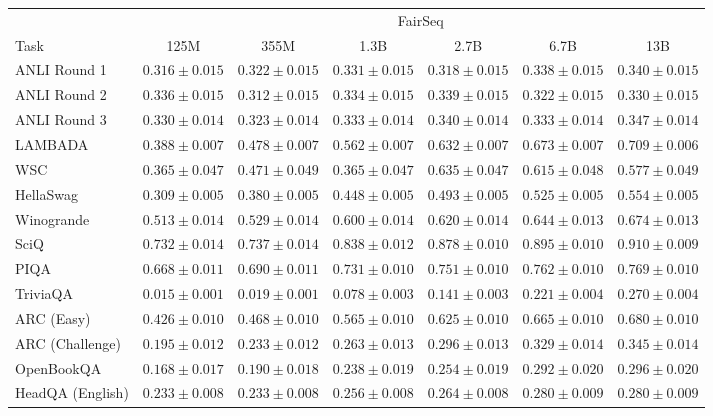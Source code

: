 \documentclass[11pt]{article}
\begin{document}
{\begin{landscape}
\begin{table}    
\centering %
\begin{tabular}{l c c c c c c }
 & \multicolumn{6}{c}{FairSeq} \\
 Task & 125M & 355M & 1.3B & 2.7B & 6.7B & 13B\\ \toprule
ANLI Round 1 & $0.316 \pm 0.015$ & $0.322 \pm 0.015$ & $0.331 \pm 0.015$ & $0.318 \pm 0.015$ & $0.338 \pm 0.015$ & $0.340 \pm 0.015$ \\ 
ANLI Round 2 & $0.336 \pm 0.015$ & $0.312 \pm 0.015$ & $0.334 \pm 0.015$ & $0.339 \pm 0.015$ & $0.322 \pm 0.015$ & $0.330 \pm 0.015$ \\ 
ANLI Round 3 & $0.330 \pm 0.014$ & $0.323 \pm 0.014$ & $0.333 \pm 0.014$ & $0.340 \pm 0.014$ & $0.333 \pm 0.014$ & $0.347 \pm 0.014$ \\ 
LAMBADA & $0.388 \pm 0.007$ & $0.478 \pm 0.007$ & $0.562 \pm 0.007$ & $0.632 \pm 0.007$ & $0.673 \pm 0.007$ & $0.709 \pm 0.006$ \\ 
WSC & $0.365 \pm 0.047$ & $0.471 \pm 0.049$ & $0.365 \pm 0.047$ & $0.635 \pm 0.047$ & $0.615 \pm 0.048$ & $0.577 \pm 0.049$ \\ 
HellaSwag & $0.309 \pm 0.005$ & $0.380 \pm 0.005$ & $0.448 \pm 0.005$ & $0.493 \pm 0.005$ & $0.525 \pm 0.005$ & $0.554 \pm 0.005$ \\ 
Winogrande & $0.513 \pm 0.014$ & $0.529 \pm 0.014$ & $0.600 \pm 0.014$ & $0.620 \pm 0.014$ & $0.644 \pm 0.013$ & $0.674 \pm 0.013$ \\ 
SciQ & $0.732 \pm 0.014$ & $0.737 \pm 0.014$ & $0.838 \pm 0.012$ & $0.878 \pm 0.010$ & $0.895 \pm 0.010$ & $0.910 \pm 0.009$ \\ 
PIQA & $0.668 \pm 0.011$ & $0.690 \pm 0.011$ & $0.731 \pm 0.010$ & $0.751 \pm 0.010$ & $0.762 \pm 0.010$ & $0.769 \pm 0.010$ \\ 
TriviaQA & $0.015 \pm 0.001$ & $0.019 \pm 0.001$ & $0.078 \pm 0.003$ & $0.141 \pm 0.003$ & $0.221 \pm 0.004$ & $0.270 \pm 0.004$ \\ 
ARC (Easy) & $0.426 \pm 0.010$ & $0.468 \pm 0.010$ & $0.565 \pm 0.010$ & $0.625 \pm 0.010$ & $0.665 \pm 0.010$ & $0.680 \pm 0.010$ \\ 
ARC (Challenge) & $0.195 \pm 0.012$ & $0.233 \pm 0.012$ & $0.263 \pm 0.013$ & $0.296 \pm 0.013$ & $0.329 \pm 0.014$ & $0.345 \pm 0.014$ \\ 
OpenBookQA & $0.168 \pm 0.017$ & $0.190 \pm 0.018$ & $0.238 \pm 0.019$ & $0.254 \pm 0.019$ & $0.292 \pm 0.020$ & $0.296 \pm 0.020$ \\ 
HeadQA (English) & $0.233 \pm 0.008$ & $0.233 \pm 0.008$ & $0.256 \pm 0.008$ & $0.264 \pm 0.008$ & $0.280 \pm 0.009$ & $0.280 \pm 0.009$ \\ 

\end{tabular}
\end{table}
\end{landscape}}
\end{document}
